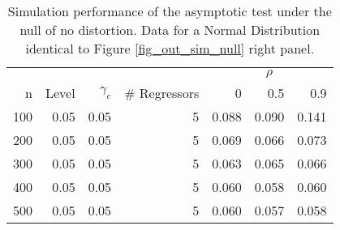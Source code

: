 \begin{table}
\small
\caption{Simulation performance of the asymptotic test under the null of no distortion. Data for a Normal Distribution identical to Figure \ref{fig_out_sim_null} right panel.}
\label{fig_out_sim_null_tabright}
 \parbox{0.99\textwidth}{
\centering
\begin{tabular}{rrrrrrr}
\toprule
\multicolumn{4}{c}{ } & \multicolumn{3}{c}{$\rho$} \\
\cmidrule(l{3pt}r{3pt}){5-7}
n & Level & $\gamma_c$ & \# Regressors & 0 & 0.5 & 0.9\\
\midrule
100 & 0.05 & 0.05 & 5 & 0.088 & 0.090 & 0.141\\
200 & 0.05 & 0.05 & 5 & 0.069 & 0.066 & 0.073\\
300 & 0.05 & 0.05 & 5 & 0.063 & 0.065 & 0.066\\
400 & 0.05 & 0.05 & 5 & 0.060 & 0.058 & 0.060\\
500 & 0.05 & 0.05 & 5 & 0.060 & 0.057 & 0.058\\
\bottomrule
\end{tabular}
}
 \end{table}